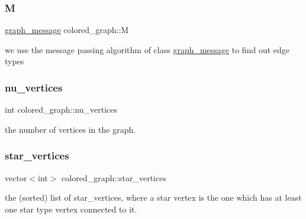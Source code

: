 \mbox{\label{classcolored__graph_ab72c568fe12f7c849ca6bffb145aec47}} 
\subsubsection{\texorpdfstring{M}{M}}
{\footnotesize\ttfamily \hyperlink{classgraph__message}{graph\+\_\+message} colored\+\_\+graph\+::M}



we use the message passing algorithm of class \hyperlink{classgraph__message}{graph\+\_\+message} to find out edge types 

\mbox{\label{classcolored__graph_a90ece8eb1fec52f3f41549ab527c1d5b}} 
\subsubsection{\texorpdfstring{nu\+\_\+vertices}{nu\_vertices}}
{\footnotesize\ttfamily int colored\+\_\+graph\+::nu\+\_\+vertices}



the number of vertices in the graph. 

\mbox{\label{classcolored__graph_ab7ee8d717abde7ad7467ef695038f574}} 
\subsubsection{\texorpdfstring{star\+\_\+vertices}{star\_vertices}}
{\footnotesize\ttfamily vector$<$int$>$ colored\+\_\+graph\+::star\+\_\+vertices}



the (sorted) list of star\+\_\+vertices, where a star vertex is the one which has at least one star type vertex connected to it. 

\mbox{\label{classcolored__graph_a2cc32e7146fa3319f83cfa940f5e1be4}} 
